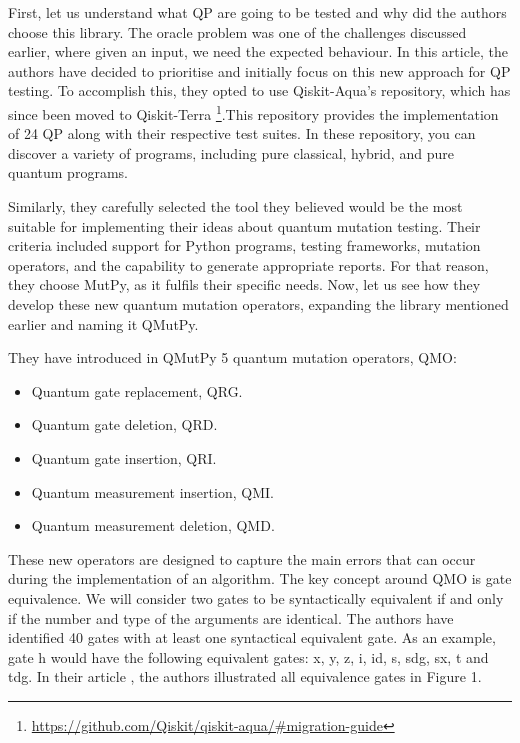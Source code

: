 \begin{itemize}
First, let us understand what QP are going to be tested and why did the authors choose this library. The oracle problem was one of the challenges discussed earlier, where given an input, we need the expected behaviour. In this article, the authors have decided to prioritise and initially focus on this new approach for QP testing. To accomplish this, they opted to use Qiskit-Aqua's repository, which has since been moved to Qiskit-Terra \footnote{\url{https://github.com/Qiskit/qiskit-aqua/\#migration-guide}}.This repository provides the implementation of 24 QP along with their respective test suites. In these repository, you can discover a variety of programs, including pure classical, hybrid, and pure quantum programs.\newline

Similarly, they carefully selected the tool they believed would be the most suitable for implementing their ideas about quantum mutation testing. Their criteria included support for Python programs, testing frameworks, mutation operators, and the capability to generate appropriate reports. For that reason, they choose MutPy, as it fulfils their specific needs. Now, let us see how they develop these new quantum mutation operators, expanding the library mentioned earlier and naming it QMutPy.\newline

They have introduced in QMutPy 5 quantum mutation operators, QMO:
\begin{itemize}
    \item Quantum gate replacement, QRG.
    \item Quantum gate deletion, QRD.
    \item Quantum gate insertion, QRI.
    \item Quantum measurement insertion, QMI.
    \item Quantum measurement deletion, QMD.
\end{itemize}

\vspace{5pt}
These new operators are designed to capture the main errors that can occur during the implementation of an algorithm. The key concept around QMO is gate equivalence. We will consider two gates to be syntactically equivalent if and only if the number and type of the arguments are identical. The authors have identified 40 gates with at least one syntactical equivalent gate. As an example, gate h would have the following equivalent gates: x, y, z, i, id, s, sdg, sx, t and tdg. In their article \cite{fortunato2022mutation}, the authors illustrated all equivalence gates in Figure 1.  \newline


\end{itemize}
